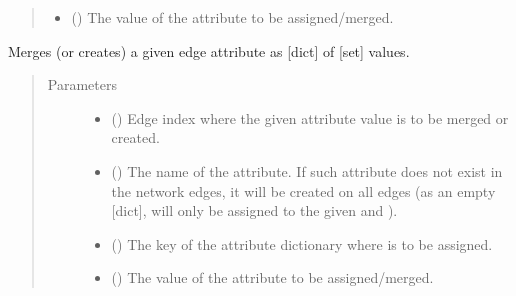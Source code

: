 \documentclass[letterpaper,10pt,english]{sphinxmanual}
\begin{document}
\begin{fulllineitems}
\begin{fulllineitems}
\begin{quote}
\begin{description}
\begin{itemize}
\item {} 
 () \textendash{} The value of the attribute to be assigned/merged.

\end{itemize}

\end{description}\end{quote}

\end{fulllineitems}


\begin{fulllineitems}
\label{\detokenize{reference:pypath.main.PyPath.add_grouped_set_eattr}}
Merges (or creates) a given edge attribute as {[}dict{]} of {[}set{]}
values.
\begin{quote}\begin{description}
\item[{Parameters}] \leavevmode\begin{itemize}
\item {} 
 () \textendash{} Edge index where the given attribute value is to be merged
or created.

\item {} 
 () \textendash{} The name of the attribute. If such attribute does not exist
in the network edges, it will be created on all edges (as an
empty {[}dict{]},  will only be assigned to the given
 and ).

\item {} 
 () \textendash{} The key of the attribute dictionary where  is to be
assigned.

\item {} 
 () \textendash{} The value of the attribute to be assigned/merged.


\end{itemize}
\end{description}
\end{quote}
\end{fulllineitems}
\end{fulllineitems}
\end{document}
